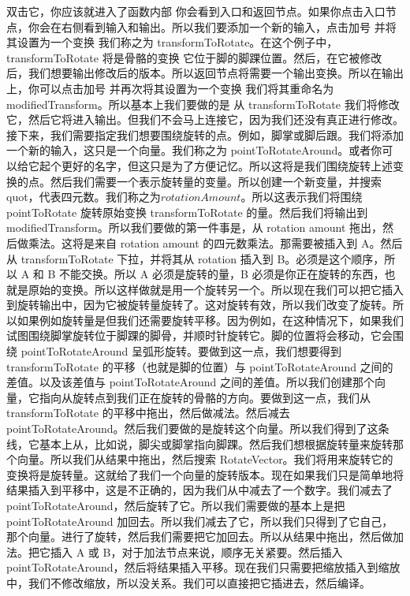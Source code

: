 \documentclass[math,code,12pt]{amznotes}
\begin{document}
双击它，你应该就进入了函数内部
你会看到入口和返回节点。如果你点击入口节点，你会在右侧看到输入和输出。所以我们要添加一个新的输入，点击加号
并将其设置为一个变换
我们称之为 transformToRotate。在这个例子中，transformToRotate 将是骨骼的变换
它位于脚的脚踝位置。然后，在它被修改后，我们想要输出修改后的版本。所以返回节点将需要一个输出变换。所以在输出上，你可以点击加号
并再次将其设置为一个变换
我们将其重命名为 modifiedTransform。所以基本上我们要做的是
从 transformToRotate 我们将修改它，然后它将进入输出。但我们不会马上连接它，因为我们还没有真正进行修改。接下来，我们需要指定我们想要围绕旋转的点。例如，脚掌或脚后跟。我们将添加一个新的输入，这只是一个向量。我们称之为 pointToRotateAround。或者你可以给它起个更好的名字，但这只是为了方便记忆。所以这将是我们围绕旋转上述变换的点。然后我们需要一个表示旋转量的变量。所以创建一个新变量，并搜索 quot，代表四元数。$我们称之为 rotationAmount$。所以这表示我们将围绕 pointToRotate 旋转原始变换 transformToRotate 的量。然后我们将输出到 modifiedTransform。所以我们要做的第一件事是，从 rotation amount 拖出，然后做乘法。这将是来自 rotation amount 的四元数乘法。那需要被插入到 A。然后从 transformToRotate 下拉，并将其从 rotation 插入到 B。必须是这个顺序，所以 A 和 B 不能交换。所以 A 必须是旋转的量，B 必须是你正在旋转的东西，也就是原始的变换。所以这样做就是用一个旋转另一个。所以现在我们可以把它插入到旋转输出中，因为它被旋转量旋转了。这对旋转有效，所以我们改变了旋转。所以如果例如旋转量是但我们还需要旋转平移。因为例如，在这种情况下，如果我们试图围绕脚掌旋转位于脚踝的脚骨，并顺时针旋转它。脚的位置将会移动，它会围绕 pointToRotateAround 呈弧形旋转。要做到这一点，我们想要得到 transformToRotate 的平移（也就是脚的位置）与 pointToRotateAround 之间的差值。以及该差值与 pointToRotateAround 之间的差值。所以我们创建那个向量，它指向从旋转点到我们正在旋转的骨骼的方向。要做到这一点，我们从 transformToRotate 的平移中拖出，然后做减法。然后减去 pointToRotateAround。然后我们要做的是旋转这个向量。所以我们得到了这条线，它基本上从，比如说，脚尖或脚掌指向脚踝。然后我们想根据旋转量来旋转那个向量。所以我们从结果中拖出，然后搜索 RotateVector。我们将用来旋转它的变换将是旋转量。这就给了我们一个向量的旋转版本。现在如果我们只是简单地将结果插入到平移中，这是不正确的，因为我们从中减去了一个数字。我们减去了 pointToRotateAround，然后旋转了它。所以我们需要做的基本上是把 pointToRotateAround 加回去。所以我们减去了它，所以我们只得到了它自己，那个向量。进行了旋转，然后我们需要把它加回去。所以从结果中拖出，然后做加法。把它插入 A 或 B，对于加法节点来说，顺序无关紧要。然后插入 pointToRotateAround，然后将结果插入平移。现在我们只需要把缩放插入到缩放中，我们不修改缩放，所以没关系。我们可以直接把它插进去，然后编译。
\end{document}
